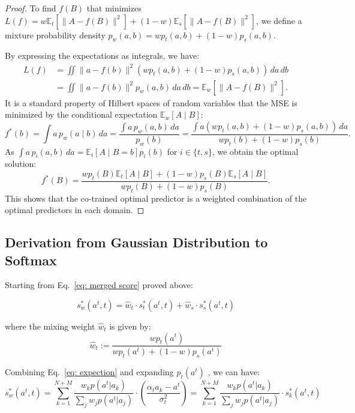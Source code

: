 \begin{proof}
To find $f(B)$ that minimizes $L(f) = w \mathbb{E}_t[\|A - f(B)\|^2] + (1 - w) \mathbb{E}_s[\|A - f(B)\|^2]$, we define a mixture probability density $p_w(a, b) = w p_t(a, b) + (1 - w) p_s(a, b)$. 

By expressing the expectations as integrals, we have:
\begin{align*}
L(f) &= \iint \|a - f(b)\|^2 \left( w p_t(a, b) + (1 - w) p_s(a, b) \right) \, da \, db \\
&= \iint \|a - f(b)\|^2 p_w(a, b) \, da \, db = \mathbb{E}_w[\|A - f(B)\|^2].
\end{align*}
It is a standard property of Hilbert spaces of random variables that the MSE is minimized by the conditional expectation $\mathbb{E}_w[A \mid B]$:
\begin{equation*}
f^*(b) = \int a \, p_w(a \mid b) \, da = \frac{\int a \, p_w(a, b) \, da}{p_w(b)} = \frac{\int a \left( w p_t(a, b) + (1 - w) p_s(a, b) \right) \, da}{w p_t(b) + (1 - w) p_s(b)}.
\end{equation*}
As $\int a \, p_i(a, b) \, da = \mathbb{E}_i[A \mid B=b] p_i(b)$ for $i \in \{t, s\}$, we obtain the optimal solution:
\begin{equation*}
f^*(B) = \frac{w p_t(B) \mathbb{E}_t[A \mid B] + (1 - w) p_s(B) \mathbb{E}_s[A \mid B]}{w p_t(B) + (1 - w) p_s(B)}.
\end{equation*}
This shows that the co-trained optimal predictor is a weighted combination of the optimal predictors in each domain.
\end{proof}

\subsection{Derivation from Gaussian Distribution to Softmax}
\label{appdx: derivation}
Starting from Eq.~\ref{eq: merged score} proved above:

\begin{equation}
s_w^*(a^t, t) = \hat{w}_t \cdot s_t^*(a^t, t) + \hat{w}_s \cdot s_s^*(a^t, t)
\end{equation}

where the mixing weight $\hat{w}_t$ is given by:
\begin{equation}
\hat{w}_t := \frac{w p_t(a^t)}{w p_t(a^t) + (1 - w) p_s(a^t)}
\end{equation}

Combining Eq.~\ref{eq: expection} and expanding $p_t(a^t)$ , we can have:
\begin{equation}
s_w^*(a^t, t) = \sum_{k=1}^{N+M} \frac{w_k p(a^t | a_k)}{\sum_j w_j p(a^t | a_j)} \cdot \left( \frac{\alpha_t a_k - a^t}{\sigma_t^2} \right)
= \sum_{k=1}^{N+M} \frac{w_k p(a^t | a_k)}{\sum_j w_j p(a^t | a_j)} \cdot s^*_k(a^t,t)
\end{equation}

